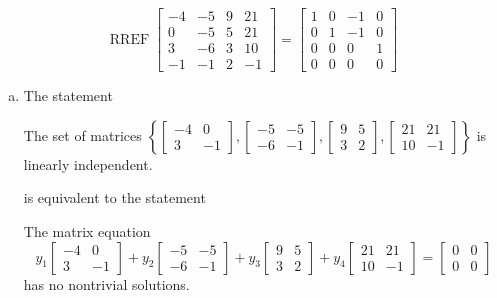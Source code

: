 \begin{exerciseAnswer} 


\[\operatorname{RREF} \left[\begin{array}{cccc}
-4 & -5 & 9 & 21 \\
0 & -5 & 5 & 21 \\
3 & -6 & 3 & 10 \\
-1 & -1 & 2 & -1
\end{array}\right] = \left[\begin{array}{cccc}
1 & 0 & -1 & 0 \\
0 & 1 & -1 & 0 \\
0 & 0 & 0 & 1 \\
0 & 0 & 0 & 0
\end{array}\right] \]


\begin{enumerate}[(a)]
\item The statement 
\begin{center}\begin{minipage}{0.8\textwidth}
 The set of matrices \( \left\{ \left[\begin{array}{cc}
-4 & 0 \\
3 & -1
\end{array}\right] , \left[\begin{array}{cc}
-5 & -5 \\
-6 & -1
\end{array}\right] , \left[\begin{array}{cc}
9 & 5 \\
3 & 2
\end{array}\right] , \left[\begin{array}{cc}
21 & 21 \\
10 & -1
\end{array}\right] \right\} \) is linearly independent.
\end{minipage}\end{center}
     is equivalent to the statement 
\begin{center}\begin{minipage}{0.8\textwidth}
 The matrix equation \[ y_{1} \left[\begin{array}{cc}
-4 & 0 \\
3 & -1
\end{array}\right] + y_{2} \left[\begin{array}{cc}
-5 & -5 \\
-6 & -1
\end{array}\right] + y_{3} \left[\begin{array}{cc}
9 & 5 \\
3 & 2
\end{array}\right] + y_{4} \left[\begin{array}{cc}
21 & 21 \\
10 & -1
\end{array}\right] = \left[\begin{array}{cc}
0 & 0 \\
0 & 0
\end{array}\right] \] has no nontrivial solutions. 
\end{minipage}\end{center}
    

\end{enumerate}
\end{exerciseAnswer}
